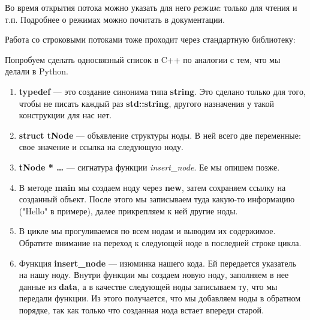 \begin{lecture}[\lectureSubject]
\begin{lecSection}
		Во время открытия потока можно указать для него \textit{режим}: только для чтения и т.п.
		Подробнее о режимах можно почитать в документации.
	\end{lecSection}	
	\begin{lecSection}
		Работа со строковыми потоками тоже проходит через стандартную библиотеку:
	\end{lecSection}
	\begin{lecSection}
		Попробуем сделать односвязный список в C++ по аналогии с тем, что мы делали в Python.
		\begin{enumerate}
			\item 		\textbf{typedef} --- это создание синонима типа \textbf{string}. Это сделано только для того, чтобы не писать каждый раз \textbf{std::string}, другого назначения у такой конструкции для нас нет.
			\item \textbf{struct tNode} --- объявление структуры ноды. В ней всего две переменные: свое значение и ссылка на следующую ноду.
			\item \textbf{tNode * \dots} --- сигнатура функции \textit{insert}\_\textit{node}. Ее мы опишем позже.
			\item В методе \textbf{main} мы создаем ноду через \textbf{new}, затем сохраняем ссылку на созданный объект. После этого мы записываем туда какую-то информацию ("Hello" в примере), далее прикрепляем к ней другие ноды.
			\item В цикле мы прогуливаемся по всем нодам и выводим их содержимое. Обратите внимание на переход к следующей ноде в последней строке цикла.
			\item Функция \textbf{insert\_node} --- изюминка нашего кода. Ей передается указатель на нашу ноду. Внутри функции мы создаем новую ноду, заполняем в нее данные из \textbf{data}, а в качестве следующей ноды записываем ту, что мы передали функции. Из этого получается, что мы добавляем ноды в обратном порядке, так как только что созданная нода встает впереди старой.
		\end{enumerate}
	\end{lecSection}
\end{lecture}

\renewcommand{\mainFolder}{/home/aleksei/github_projects/latex_works/informatics}
\renewcommand{\myFolder}{\mainFolder/lecture_\arabic{lectureNo}/}

